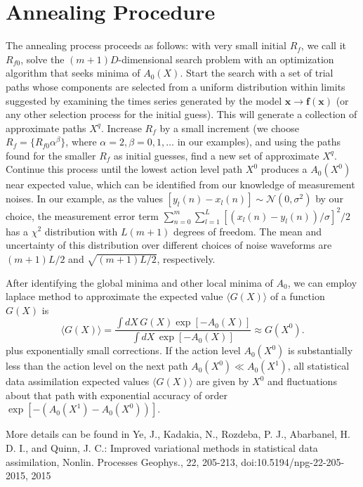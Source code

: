 \documentclass[11pt]{article}
\begin{document}
\section{Annealing Procedure}
The annealing process proceeds as follows: with very small initial $R_f$, we call it $R_{f0}$, solve the $(m+1)D$-dimensional search problem with an optimization algorithm that seeks minima of $A_0(X)$. Start the search with a set of trial paths whose components are selected from a uniform distribution within limits suggested by examining the times series generated by the model $\mathbf{x} \to \mathbf{f}(\mathbf{x})$ (or any other selection process for the initial guess). This will generate a collection of approximate paths $X^q$. Increase $R_f$ by a small increment (we choose $R_f = \{R_{f0}\alpha^{\beta}\}$, where $\alpha=2, \beta = 0,1,\dots$ in our examples),  and using the paths found for the smaller $R_f$ as initial guesses, find a new set of approximate $X^q$. Continue this process until the lowest action level path $X^0$ produces a $A_0(X^0)$ near expected value, which can be identified from our knowledge of measurement noises. In our example, as the values $[y_l(n) - x_l(n)]\sim\mathcal{N}(0,\sigma^2)$ by our choice, the measurement error term  $\sum_{n=0}^m \sum_{l=1}^L [(x_l(n) - y_l(n))/\sigma]^2/2$ has a $\chi^2$ distribution with $L(m+1)$ degrees of freedom. The mean and uncertainty of this distribution over different choices of noise waveforms are $(m+1)L/2$ and $\sqrt{(m+1)L/2}$, respectively.

After identifying the global minima and other local minima of $A_0$, we can employ laplace method to approximate the expected value $\langle G(X) \rangle$ of a function $G(X)$ is 
\begin{equation}
\langle G({X}) \rangle = \frac{\int dX\, G(X) \exp[-A_0(X)]}{\int dX\, \exp[-A_0(X)]}\approx G(X^0).
\label{eq:expect}
\end{equation}
plus exponentially small corrections.
If the action level $A_0(X^0)$ is substantially less than the action level on the next path $A_0(X^0) \ll A_0(X^1)$, all statistical data assimilation expected values $\langle G(X)\rangle$ are given by $X^0$ and fluctuations about that path with exponential accuracy of order $\exp[-(A_0(X^1) - A_0(X^0))]$.

More details can be found in Ye, J., Kadakia, N., Rozdeba, P. J., Abarbanel, H. D. I., and Quinn, J. C.: Improved variational methods in statistical data assimilation, Nonlin. Processes Geophys., 22, 205-213, doi:10.5194/npg-22-205-2015, 2015
\end{document}
